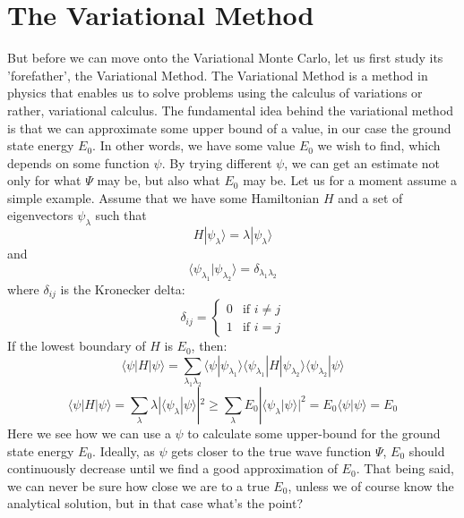 \documentclass[12pt]{article}
\begin{document}
{\section{The Variational Method} \label{varmethod}
But before we can move onto the Variational Monte Carlo, let us first study its 'forefather', the Variational Method. The Variational Method is a method in physics that enables us to solve problems using the calculus of variations or rather, variational calculus. The fundamental idea behind the variational method is that we can approximate some upper bound of a value, in our case the ground state energy $E_0$. In other words, we have some value $E_0$ we wish to find, which depends on some function $\psi$. By trying different $\psi$, we can get an estimate not only for what $\Psi$ may be, but also what $E_0$ may be. \newline
Let us for a moment assume a simple example. Assume that we have some Hamiltonian $H$ and a set of eigenvectors $\psi_\lambda$ such that
\begin{equation*}
    H | \psi_\lambda \rangle = \lambda | \psi_\lambda \rangle
\end{equation*}
and
\begin{equation*}
    \langle \psi_{\lambda_1} | \psi_{\lambda_2} \rangle = \delta_{\lambda_1 \lambda_2}
\end{equation*}
where $\delta_{ij}$ is the Kronecker delta:
\begin{equation*}
    \delta_{ij} = \begin{cases}
        0 & \text{if } i \neq j \\
        1 & \text{if } i = j
        \end{cases}
\end{equation*}
\newline If the lowest boundary of $H$ is $E_0$, then:
\begin{equation*}
    \langle \psi | H | \psi \rangle = \sum_{\lambda_1 \lambda_2} \langle \psi | \psi_{\lambda_1} \rangle  \langle \psi_{\lambda_1} | H | \psi_{\lambda_2} \rangle \langle \psi_{\lambda_2} | \psi \rangle
\end{equation*}
\begin{equation}
    \langle \psi | H |\psi \rangle = \sum_{\lambda} \lambda | \langle \psi_\lambda | \psi \rangle |^2 \geq \sum_\lambda E_0 | \langle \psi_\lambda | \psi \rangle |^2 = E_0 \langle \psi | \psi \rangle = E_0
\end{equation}
Here we see how we can use a $\psi$ to calculate some upper-bound for the ground state energy $E_0$. Ideally, as $\psi$ gets closer to the true wave function $\Psi$, $E_0$ should continuously decrease until we find a good approximation of $E_0$. That being said, we can never be sure how close we are to a true $E_0$, unless we of course know the analytical solution, but in that case what's the point?
}
\end{document}
